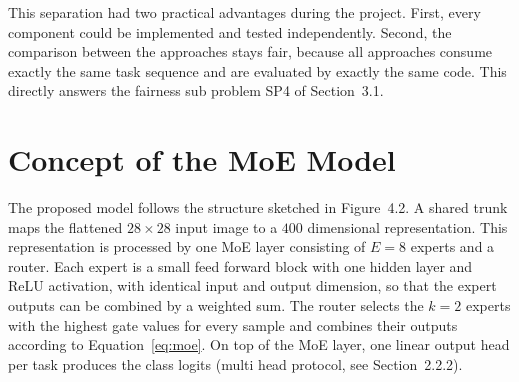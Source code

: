 This separation had two practical advantages during the project. First,
every component could be implemented and tested independently. Second, the
comparison between the approaches stays fair, because all approaches
consume exactly the same task sequence and are evaluated by exactly the
same code. This directly answers the fairness sub problem SP4 of
Section~3.1.

\section{Concept of the MoE Model}
\label{sec:moedesign}

The proposed model follows the structure sketched in Figure~4.2. A shared
trunk maps the flattened $28 \times 28$ input image to a $400$ dimensional
representation. This representation is processed by one MoE layer
consisting of $E = 8$ experts and a router. Each expert is a small feed
forward block with one hidden layer and ReLU activation, with identical
input and output dimension, so that the expert outputs can be combined by a
weighted sum. The router selects the $k = 2$ experts with the highest gate
values for every sample and combines their outputs according to
Equation~\eqref{eq:moe}. On top of the MoE layer, one linear output head
per task produces the class logits (multi head protocol, see
Section~2.2.2).

